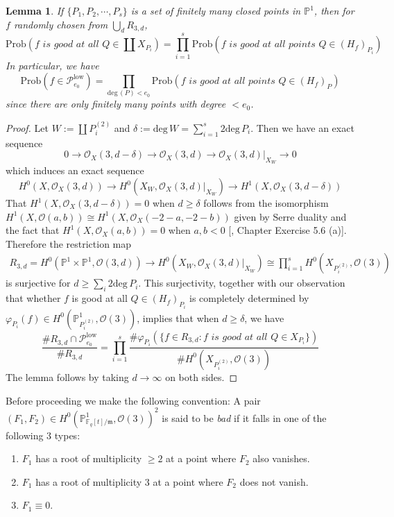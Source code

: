 \documentclass[12pt]{article}
\theoremstyle{plain}
\newtheorem{lemma}[equation]{Lemma}
\theoremstyle{definition}
\newcommand{\fm}{\mathfrak{m}}
\newcommand{\IF}{\mathbb{F}}
\newcommand{\IP}{\mathbb{P}}
\newcommand{\sO}{\mathcal{O}}
\newcommand{\sP}{\mathcal{P}}
\renewcommand{\deg}{\mathrm{deg}\,}
\newcommand\union{\bigcup}
\newcommand{\<}{\langle}
\renewcommand{\>}{\rangle}
\newcommand{\Prob}{\mathrm{Prob}}
\begin{document}
\begin{lemma}
\label{Low}
If $\{P_1, P_2, \cdots, P_s\}$ is a set of finitely many closed points in $\IP^1$, then for $f$ randomly chosen from $\union_d R_{3, d}$,
$$ \Prob(f \textit{ is good at all } Q \in \coprod X_{P_i}) = \prod_{i = 1}^s \Prob( f \textit{ is good at all points } Q \in (H_f)_{P_i} ) $$
In particular, we have
$$\Prob(f \in \sP_{e_0}^{\mathrm{low}})  = \prod_{\deg(P) < e_0}  \Prob( f \textit{ is good at all points } Q \in (H_f)_P ) $$
since there are only finitely many points with degree $< e_0$. 
\end{lemma}
\begin{proof} 
Let $W := \coprod P_i^{(2)}$ and $\delta := \deg W = \sum_{i = 1}^s 2 \deg P_i$. Then we have an exact sequence 
$$ 0 \to \sO_X(3, d - \delta) \to \sO_X(3, d) \to \sO_X(3, d)|_{X_W} \to 0  $$
which induces an exact sequence 
$$ H^0(X, \sO_X(3, d)) \to H^0(X_W, \sO_X(3, d)|_{X_W}) \to H^1(X, \sO_X(3, d - \delta)) $$
That $H^1(X, \sO_X(3, d - \delta)) = 0$ when $d \ge \delta$ follows from the isomorphism $H^1(X, \sO(a, b)) \cong H^1(X, \sO_X(-2-a, -2-b))$ given by Serre duality and the fact that $H^1(X, \sO_X(a, b)) = 0$ when $a, b < 0$ [\cite{Hartshorne}, Chapter \uppercase\expandafter{} Exercise 5.6 (a)].
Therefore the restriction map
\begin{align*}
R_{3, d} = H^0(\IP^1 \times \IP^1, \sO(3, d)) \to H^0(X_W, \sO_X(3, d)|_{X_W}) \cong \prod_{i = 1}^s H^0(X_{P_i^{(2)}}, \sO(3))
\end{align*}
is surjective for $ d \ge \sum_i 2 \deg P_i$. This surjectivity, together with our observation that whether $f$ is good at all $Q \in (H_f)_{P_i}$ is completely determined by $\varphi_{P_i}(f) \in H^0(\IP^1_{P_i^{(2)}}, \sO(3))$, implies that when $d \ge \delta$, we have 
$$ \frac{\# R_{3, d} \cap \sP_{e_0}^{\mathrm{low}}}{\# R_{3, d}} = \prod_{i = 1}^s \frac{\# \varphi_{P_i}(\{ f \in R_{3, d} : f \textit{ is good at all }Q \in X_{P_i} \})}{\# H^0(X_{P^{(2)}_i}, \sO(3))} $$
The lemma follows by taking $d \to \infty$ on both sides. 
\end{proof}
Before proceeding we make the following convention: A pair $(F_1, F_2) \in H^0(\IP^1_{\IF_q[t]/\fm}, \sO(3))^2$ is said to be \textit{bad} if it falls in one of the following 3 types:
\begin{enumerate}
\item $F_1$ has a root of multiplicity $\ge 2$ at a point where $F_2$ also vanishes. 
\item $F_1$ has a root of multiplicity $3$ at a point where $F_2$ does not vanish. 
\item $F_1 \equiv 0$.
\end{enumerate}
\end{document}
